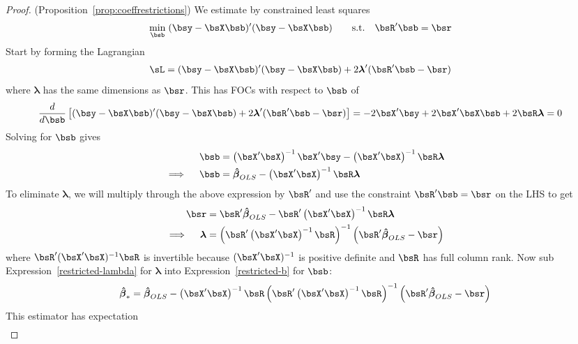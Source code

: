 \documentclass[12pt]{article}
\theoremstyle{plain}
\theoremstyle{definition}
\theoremstyle{remark}
\newcommand{\bslambda}{\boldsymbol{\lambda}}
\newcommand{\bshatbeta}{\boldsymbol{\hat{\beta}}}
\begin{document}
\begin{proof}(Proposition~\ref{prop:coeffrestrictions})
We estimate by constrained least squares
\begin{align*}
  \min_{\bsb} \; &(\bsy-\bsX\bsb)'(\bsy-\bsX\bsb)
  \qquad
  \text{s.t.} \quad
  \bsR'\bsb = \bsr
\end{align*}
Start by forming the Lagrangian
\begin{align*}
  \sL
  &=
  (\bsy-\bsX\bsb)'(\bsy-\bsX\bsb)
  + 2\bslambda' (\bsR'\bsb - \bsr)
\end{align*}
where $\bslambda$ has the same dimensions as $\bsr$.
This has FOCs with respect to $\bsb$ of
\begin{align*}
  \frac{d}{d\bsb}
  \left[
    (\bsy-\bsX\bsb)'(\bsy-\bsX\bsb)
    + 2\bslambda' (\bsR'\bsb - \bsr)
  \right]
  &= -2\bsX'\bsy +2\bsX'\bsX\bsb + 2\bsR\bslambda
  =0
\end{align*}
Solving for $\bsb$ gives
\begin{align}
  \bsb &=
  \left(\bsX'\bsX\right)^{-1} \bsX'\bsy
  - \left(\bsX'\bsX\right)^{-1} \bsR\bslambda
  \notag\\
  \implies\quad
  \bsb &=
  \bshatbeta_{OLS} - \left(\bsX'\bsX\right)^{-1}  \bsR\bslambda
  \label{restricted-b}
\end{align}
To eliminate $\bslambda$, we will multiply through the above expression
by $\bsR'$ and use the constraint $\bsR'\bsb=\bsr$ on the LHS to get
\begin{align}
  \bsr
  &=
  \bsR'\bshatbeta_{OLS}
  - \bsR'\left(\bsX'\bsX\right)^{-1} \bsR\bslambda \notag\\
  \implies\quad
  \bslambda
  &=
  \left(\bsR'\left(\bsX'\bsX\right)^{-1}  \bsR\right)^{-1}
  \left(\bsR'\bshatbeta_{OLS} -  \bsr\right)
  \label{restricted-lambda}
\end{align}
where $\bsR'(\bsX'\bsX)^{-1}\bsR$ is invertible because
$(\bsX'\bsX)^{-1}$ is positive definite and $\bsR$ has full column rank.
Now sub Expression~\ref{restricted-lambda} for $\bslambda$ into
Expression~\ref{restricted-b} for $\bsb$:
\begin{align*}
  \bshatbeta_*
  =
  \bshatbeta_{OLS} - \left(\bsX'\bsX\right)^{-1}  \bsR
  \left(\bsR'\left(\bsX'\bsX\right)^{-1}  \bsR\right)^{-1}
  \left(\bsR'\bshatbeta_{OLS} -  \bsr\right)
\end{align*}
This estimator has expectation
\begin{align*}

\end{align*}
\end{proof}
\end{document}
